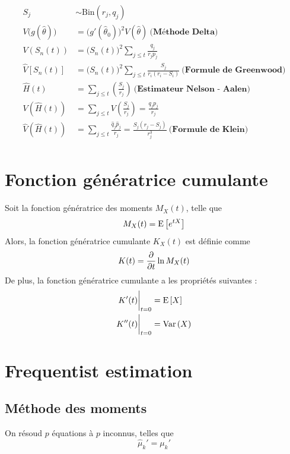\documentclass[french, landscape]{article}
\begin{document}
\begin{multicols*}{3}

\begin{align*}
	S_j &\sim \text{Bin}(r_j, q_j) \\
	V\big(g(\widehat{\theta})\big) &= \big(g'(\widehat{\theta}_{0})\big)^2 V(\widehat{\theta})\: \textbf{(Méthode Delta)} \\
	V(S_n(t)) &= \big( S_n(t) \big)^2 \sum_{j \le t}\frac{q_j}{r_j p_j} \\
	\widehat{V}[S_{n}(t)] &= \big(S_{n}(t)\big)^2 \sum_{j \le t} \frac{S_j}{r_i(r_i - S_i)}\: \textbf{(Formule de Greenwood)} \\
	\widehat{H}(t) &= \sum_{j \le t} \left( \frac{S_{j}}{r_{j}}\right)\: \textbf{(Estimateur Nelson - Aalen)} \\    
	V(\widehat{H}(t)) &= \sum_{j \le t} V\left( \frac{S_j}{r_j} \right) = \frac{q_j p_j}{r_j} \\
	\widehat{V}(\widehat{H}(t)) &= \sum_{j \le t} \frac{\widehat{q}_j \widehat{p}_j}{r_j} = \frac{S_j (r_j - S_j)}{r_j^3}\: \textbf{(Formule de Klein)} \\    
\end{align*}


\section{Fonction génératrice cumulante}
Soit la fonction génératrice des moments $M_X(t)$, telle que
\[M_X(t) = \mathrm{E} \left[ e^{tX} \right]\]
Alors, la fonction génératrice cumulante $K_X(t)$ est définie comme
\[K(t) = \frac{\partial}{\partial t} \ln M_X(t)\]
De plus, la fonction génératrice cumulante a les propriétés suivantes : 
\begin{align*}
K'(t) \biggr \rvert_{t = 0} & =   \mathrm{E} \left[ X \right] \\
K''(t) \biggr \rvert_{t=0} & = \mathrm{Var} \left( X \right) \\
\end{align*}


\section{Frequentist estimation}
\subsection*{Méthode des moments}
On résoud $p$ équations à $p$ inconnus, telles que
\[\hat{\mu}_k' = \mu_k'\]


\end{multicols*}
\end{document}
